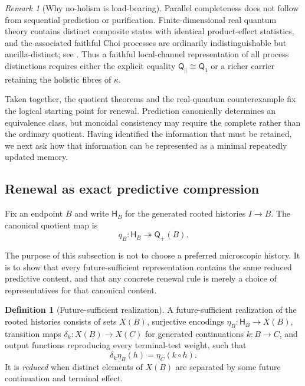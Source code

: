 \documentclass[11pt]{article}
\theoremstyle{definition}
\newtheorem{definition}[theorem]{Definition}
\theoremstyle{remark}
\newtheorem{remark}[theorem]{Remark}
\newcommand{\Qq}{\mathsf Q}
\begin{document}
\begin{remark}[Why no-holism is load-bearing]
\label{rem:no-holism}
Parallel completeness does not follow from sequential prediction or
purification.  Finite-dimensional real quantum theory contains distinct
composite states with identical product-effect statistics, and the associated
faithful Choi processes are ordinarily indistinguishable but ancilla-distinct;
see \cite{BarnumWilce2014,ChiribellaProcessTomography2021}.  Thus a faithful
local-channel representation of all process distinctions requires either the
explicit equality $\Qq_{\parallel}\cong\Qq_1$ or a richer carrier retaining the
holistic fibres of $\kappa$.
\end{remark}

Taken together, the quotient theorems and the real-quantum counterexample fix the
logical starting point for renewal.  Prediction canonically determines an
equivalence class, but monoidal consistency may require the complete rather than
the ordinary quotient.  Having identified the information that must be retained,
we next ask how that information can be represented as a minimal repeatedly
updated memory.

\subsection{Renewal as exact predictive compression}

Fix an endpoint $B$ and write $\mathsf H_B$ for the generated rooted histories
$I\to B$.  The canonical quotient map is
\[
 q_B:\mathsf H_B\twoheadrightarrow\Qq_+(B).
\]

The purpose of this subsection is not to choose a preferred microscopic history.
It is to show that every future-sufficient representation contains the same
reduced predictive content, and that any concrete renewal rule is merely a choice
of representatives for that canonical content.

\begin{definition}[Future-sufficient realization]
\label{def:future-sufficient}
A future-sufficient realization of the rooted histories consists of sets
$X(B)$, surjective encodings $\eta_B:\mathsf H_B\to X(B)$, transition maps
$\delta_k:X(B)\to X(C)$ for generated continuations $k:B\to C$, and output
functions reproducing every terminal-test weight, such that
\[
 \delta_k\eta_B(h)=\eta_C(k\circ h).
\]
It is \emph{reduced} when distinct elements of $X(B)$ are separated by some
future continuation and terminal effect.
\end{definition}
\end{document}
